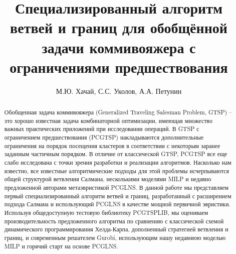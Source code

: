 \documentclass{article}
\author{М.Ю. Хачай, С.С. Уколов, А.А. Петунин}
\title{
Специализированный алгоритм ветвей и границ
для обобщённой задачи коммивояжера
с ограничениями предшествования
}
\begin{document}
\maketitle

\begin{abstract}
Обобщенная задача коммивояжера (Generalized Traveling Salesman Problem, GTSP) -- 
это хорошо известная задача комбинаторной оптимизации, 
имеющая множество важных практических приложений при исследовании операций. 
В GTSP с ограничением предшествования (PCGTSP) 
накладываются дополнительные ограничения на порядок 
посещения кластеров в соответствии 
с некоторым заранее заданным частичным порядком.
В отличие от классической GTSP, 
PCGTSP все еще слабо исследована с точки зрения разработки и реализации алгоритмов.
Насколько нам известно, 
все известные алгоритмические подходы для этой проблемы 
исчерпываются общей структурой ветвления Салмана, 
несколькими моделями MILP 
и недавно предложенной авторами метаэвристикой PCGLNS. 
В данной работе мы представляем первый специализированный алгоритм ветвей и границ, 
разработанный с расширением подхода Салмана и использующий PCGLNS 
в качестве мощной первичной эвристики. 
Используя общедоступную тестовую библиотеку PCGTSPLIB, 
мы оцениваем производительность предложенного алгоритма 
по сравнению с классической схемой динамического программирования Хелда-Карпа,
дополненный стратегией ветвления и границ,
и современным решателем Gurobi, 
использующим нашу недавнюю моделью MILP 
и горячий старт на основе PCGLNS.

\end{abstract}  


% 







% 
% 
% 
\printbibliography[]
\end{document}
